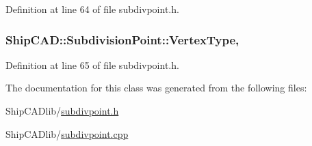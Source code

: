 Definition at line 64 of file subdivpoint.\-h.

\hypertarget{classShipCAD_1_1SubdivisionPoint_ab926cef40515c3a4c94a902fb50aa35a}{
\subsubsection[{Vertex\-Type}]{ Ship\-C\-A\-D\-::\-Subdivision\-Point\-::\-Vertex\-Type\hspace{0.3cm}{\ttfamily [read]}, {\ttfamily [write]}}}\label{classShipCAD_1_1SubdivisionPoint_ab926cef40515c3a4c94a902fb50aa35a}


Definition at line 65 of file subdivpoint.\-h.



The documentation for this class was generated from the following files\-:\begin{DoxyCompactItemize}
\item 
Ship\-C\-A\-Dlib/\hyperlink{subdivpoint_8h}{subdivpoint.\-h}\item 
Ship\-C\-A\-Dlib/\hyperlink{subdivpoint_8cpp}{subdivpoint.\-cpp}\end{DoxyCompactItemize}
